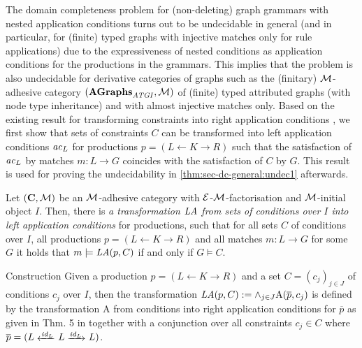 The domain completeness problem for (non-deleting) graph grammars with nested application conditions turns out to be undecidable in general (and in particular, for (finite) typed graphs with injective matches only for rule applications) due to the expressiveness of nested conditions as application conditions for the productions in the grammars.
This implies that the problem is also undecidable for derivative categories of graphs such as the (finitary) ${\cal M}$-adhesive category $(\mathbf{\mathbf{AGraphs}_\mathit{ATGI},{\cal M}})$ of (finite) typed attributed graphs (with node type inheritance) and with almost injective matches only.
Based on the existing result for transforming constraints into right application conditions \cite{DBLP:journals/mscs/HabelP09}, we first show that sets of constraints $C$ can be transformed into left application conditions $\mathit{ac}_L$ for productions $p=(L \gets K \to R)$ such that the satisfaction of $\mathit{ac}_L$ by matches $m\colon L \to G$ coincides with the satisfaction of $C$ by $G$.
This result is used for proving the undecidability in \cref{thm:sec-dc-general:undec1} afterwards.

\begin{lemma}
\label{lem:sce-ds-general:trafo_c_ac}
Let $(\mathbf{C},{\cal M})$ be an ${\cal M}$-adhesive category with $\mathcal{E}$-${\cal M}$-factorisation and ${\cal M}$-initial object $I$.
Then, there is \emph{a transformation $\mathit{LA}$ from sets of conditions over $I$ into left application conditions} for productions, such that for all sets $C$ of conditions over $I$, all productions $p=(L \gets K \to R)$ and all matches $m\colon L \to G$ for some $G$ it holds that $m \models \mathit{LA}(p,C)$ if and only if $G \models C$. 
\envEndMarker
\end{lemma}

\begin{paragraph}{Construction}
Given a production $p=(L \gets K \to R)$ and a set $C=(c_j)_{j \in J}$ of conditions $c_j$ over $I$, then the transformation $\mathit{LA}(p,C):=\wedge_{j \in J}\text{A}(\overline{p},c_j)$ is defined by the transformation $\text{A}$ from conditions into right application conditions for $\overline{p}$ as given in Thm. 5 in \cite{DBLP:journals/mscs/HabelP09} together with a conjunction over all constraints $c_j \in C$ where $\overline{p}=(L \transB{\id_L} L \trans{\id_L} L)$.
\end{paragraph}

